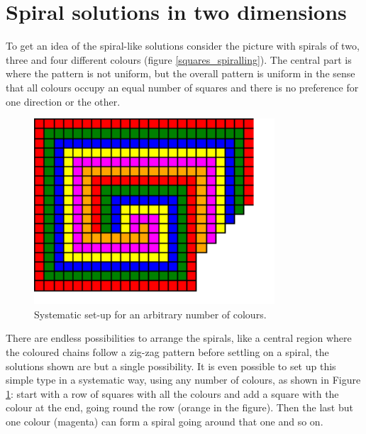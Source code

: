 \documentclass[onecolumn]{article}
\begin{document}
\section*{Spiral solutions in two dimensions}
To get an idea of the spiral-like solutions consider the picture with spirals of
two, three and four different colours (figure \ref{squares_spiralling}). The central part is where the pattern is
not uniform, but the overall pattern is uniform in the sense that all colours
occupy an equal number of squares and there is no preference for one direction
or the other.

\begin{figure}
\center
\caption{Systematic set-up for an arbitrary number of colours.}
\label{systematic_spiralling}
\includegraphics[width=0.8\textwidth]{systematic_spiralling.pdf}
\end{figure}

There are endless possibilities to arrange the spirals, like a central region where the coloured
chains follow a zig-zag pattern before settling on a spiral, the solutions shown are but a
single possibility. It is even possible to set up this simple type in a systematic way,
using any number of colours, as shown in Figure \ref{systematic_spiralling}: start with a row
of squares with all the colours and add a square with the colour at the end, going round the row (orange in the figure).
Then the last but one colour (magenta) can form a spiral going around that one and so on.
\end{document}
